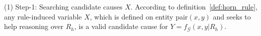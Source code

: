 (1) Step-1: Searching candidate causes $X$.
According to definition~\ref{def:horn_rule}, any rule-induced variable $X$, which is defined on entity pair$(x,y)$ and seeks to help reasoning over $R_h$, is a valid candidate cause for $Y=f_{\mathcal{G}}(x,y|R_h)$.
